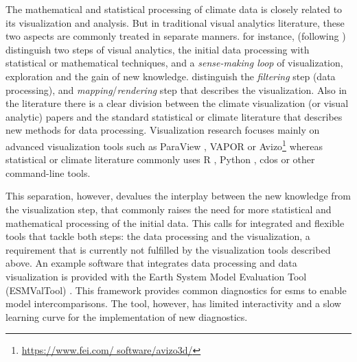 \documentclass[
11pt, %
english, %
singlespacing, %
headsepline, %
]{MastersDoctoralThesis} %
\begin{document}
\begin{NoHyper}
\begin{refsection}
The mathematical and statistical processing of climate data is closely related to its visualization and analysis. But in traditional visual analytics literature, these two aspects are commonly treated in separate manners. \cite{KeimAndrienkoFeketeEtAl2008} for instance, (following \cite{Wijk2005}) distinguish two steps of visual analytics, the initial data processing with statistical or mathematical techniques, and a \textit{sense-making loop} of visualization, exploration and the gain of new knowledge. \cite{BoettingerRoeber2019} distinguish the \textit{filtering} step (data processing), and \textit{mapping}/\textit{rendering} step that describes the visualization. Also in the literature there is a clear division between the climate visualization (or visual analytic) papers and the standard statistical or climate literature that describes new methods for data processing. Visualization research focuses mainly on advanced visualization tools such as ParaView \citep{Ayachit2015}, VAPOR \citep{ClyneMininniNortonEtAl2007} or Avizo\footnote{\url{https://www.fei.com/
software/avizo3d/}} \citep[e.g.][]{RautenhausBoettingerSiemenEtAl2018, NockeBuschmannDongesEtAl2015, WongShenLeungEtAl2014, BoettingerRoeber2019} whereas statistical or climate literature commonly uses R \citep{RCT2019}, Python \citep{Oliphant2006, PerezGrangerHunter2011}, \glspl{cdo} \citep{Schulzweida2019} or other command-line tools.

This separation, however, devalues the interplay between the new knowledge from the visualization step, that commonly raises the need for more statistical and mathematical processing of the initial data. This calls for integrated and flexible tools that tackle both steps: the data processing and the visualization, a requirement that is currently not fulfilled by the visualization tools described above. An example software that integrates data processing and data visualization is provided with the Earth System Model Evaluation Tool (ESMValTool) \citep{EyringRighiLauerEtAl2016}. This framework provides common diagnostics for \glspl{esm} to enable model intercomparisons. The tool, however, has limited interactivity and a slow learning curve for the implementation of new diagnostics.


\end{refsection}
\end{NoHyper}
\end{document}
